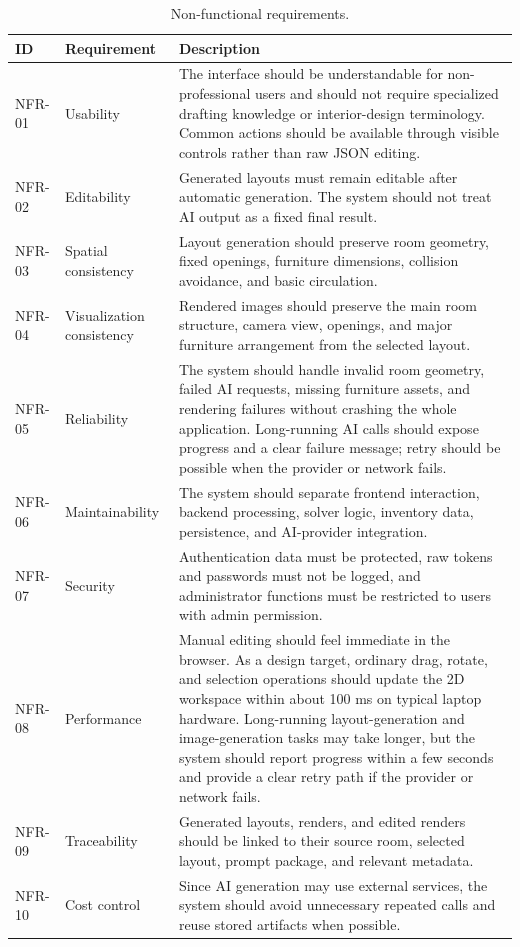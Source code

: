 \begingroup
\small
\setlength{\tabcolsep}{4pt}
\renewcommand{\arraystretch}{1.15}
\begin{xltabular}{\textwidth}{|>{\raggedright\arraybackslash}p{1.6cm}|>{\raggedright\arraybackslash}p{3.1cm}|>{\raggedright\arraybackslash}X|}
\caption{Non-functional requirements.}\label{tab:2-6}\\
\hline
\textbf{ID} & \textbf{Requirement} & \textbf{Description} \\
\hline
NFR-01 & Usability & The interface should be understandable for non-professional users and should not require specialized drafting knowledge or interior-design terminology. Common actions should be available through visible controls rather than raw JSON editing. \\
\hline
NFR-02 & Editability & Generated layouts must remain editable after automatic generation. The system should not treat AI output as a fixed final result. \\
\hline
NFR-03 & Spatial consistency & Layout generation should preserve room geometry, fixed openings, furniture dimensions, collision avoidance, and basic circulation. \\
\hline
NFR-04 & Visualization consistency & Rendered images should preserve the main room structure, camera view, openings, and major furniture arrangement from the selected layout. \\
\hline
NFR-05 & Reliability & The system should handle invalid room geometry, failed AI requests, missing furniture assets, and rendering failures without crashing the whole application. Long-running AI calls should expose progress and a clear failure message; retry should be possible when the provider or network fails. \\
\hline
NFR-06 & Maintainability & The system should separate frontend interaction, backend processing, solver logic, inventory data, persistence, and AI-provider integration. \\
\hline
NFR-07 & Security & Authentication data must be protected, raw tokens and passwords must not be logged, and administrator functions must be restricted to users with admin permission. \\
\hline
NFR-08 & Performance & Manual editing should feel immediate in the browser. As a design target, ordinary drag, rotate, and selection operations should update the 2D workspace within about 100 ms on typical laptop hardware. Long-running layout-generation and image-generation tasks may take longer, but the system should report progress within a few seconds and provide a clear retry path if the provider or network fails. \\
\hline
NFR-09 & Traceability & Generated layouts, renders, and edited renders should be linked to their source room, selected layout, prompt package, and relevant metadata. \\
\hline
NFR-10 & Cost control & Since AI generation may use external services, the system should avoid unnecessary repeated calls and reuse stored artifacts when possible. \\
\hline
\end{xltabular}
\endgroup

